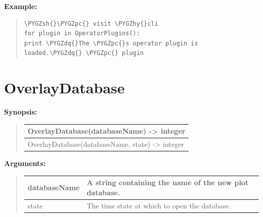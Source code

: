 \documentclass[letterpaper,10pt,english]{sphinxmanual}
\def\PYGZsh{\char`\#}
\def\PYGZpc{\char`\%}
\def\PYGZhy{\char`\-}
\def\PYGZdq{\char`\"}
\begin{document}
\begin{DUlineblock}{0em}
\item[] 
\end{DUlineblock}

\begin{DUlineblock}{0em}
\item[] \textbf{Example:}
\item[] 
\end{DUlineblock}
\begin{quote}

\begin{Verbatim}[commandchars=\\\{\}]
\PYGZsh{}\PYGZpc{} visit \PYGZhy{}cli
for plugin in OperatorPlugins():
print \PYGZdq{}The \PYGZpc{}s operator plugin is loaded.\PYGZdq{} \PYGZpc{} plugin
\end{Verbatim}
\end{quote}


\section{OverlayDatabase}
\label{functions:overlaydatabase}
\begin{DUlineblock}{0em}
\item[] \textbf{Synopsis:}
\end{DUlineblock}
\begin{quote}

\begin{tabulary}{\linewidth}{|L|}
\hline

OverlayDatabase(databaseName) -\textgreater{} integer
\\
\hline
OverlayDatabase(databaseName, state) -\textgreater{} integer
\\
\hline\end{tabulary}

\end{quote}

\begin{DUlineblock}{0em}
\item[] 
\item[] \textbf{Arguments:}
\end{DUlineblock}
\begin{quote}

\begin{tabulary}{\linewidth}{|L|L|}
\hline

databaseName
 & 
A string containing the name of the new plot database.
\\
\hline
state
 & 
The time state at which to open the database.
\\
\hline\end{tabulary}

\end{quote}
\end{document}
